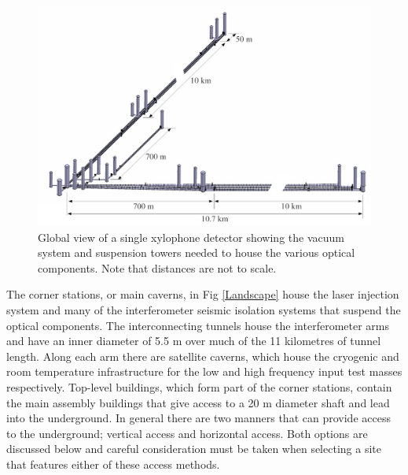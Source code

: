 \begin{figure}[t!]
\centering
\includegraphics[width=17cm]{./Sec_SiteInfra/Figures/infra2.jpg}
\caption{Global view of a single xylophone detector showing the vacuum system and suspension towers needed to house the various optical components. Note that distances are not to scale.}
\label{infra2}
\end{figure}

The corner stations, or main caverns, in Fig \ref{Landscape} house the laser injection system and many of the interferometer seismic isolation systems that suspend the optical components. The interconnecting tunnels house the interferometer arms and have an inner diameter of 5.5 m over much of the 11 kilometres of tunnel length. Along each arm there are satellite caverns, which house the cryogenic and room temperature infrastructure for the low and high frequency input test masses respectively.  Top-level buildings, which form part of the corner stations, contain the main assembly buildings that give access to a 20 m diameter shaft and lead into the underground. In general there are two manners that can provide access to the underground; vertical access and horizontal access. Both options are discussed below and careful consideration must be taken when selecting a site that features either of these access methods.   

\FloatBarrier

